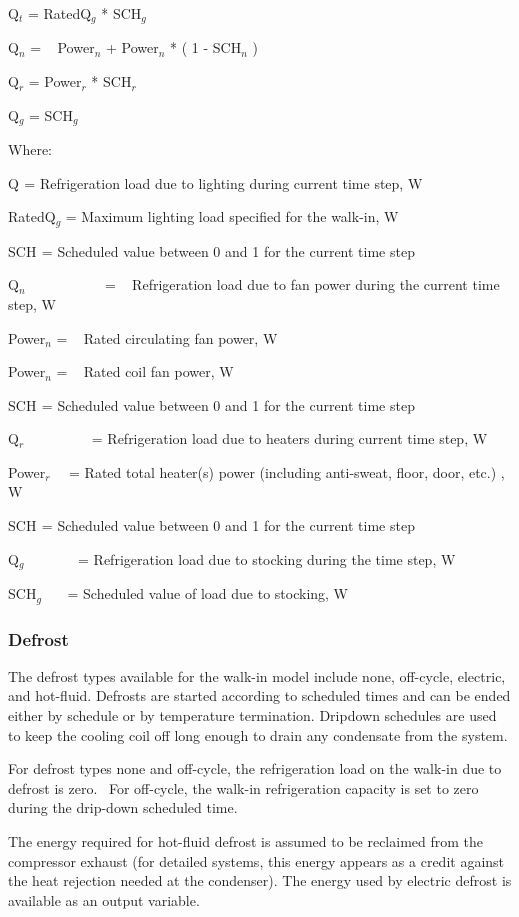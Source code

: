 Q\(_{t}\) = RatedQ\(_{g}\) * SCH\(_{g}\)

Q\(_{n}\) = ~ Power\(_{n}\) + Power\(_{n}\) * ( 1 - SCH\(_{n}\) )

Q\(_{r}\) = Power\(_{r}\) * SCH\(_{r}\)

Q\(_{g}\) = SCH\(_{g}\)

Where:

Q\(_{ }\) = Refrigeration load due to lighting during current time step, W

RatedQ\(_{g}\) = Maximum lighting load specified for the walk-in, W

SCH\(_{ }\) = Scheduled value between 0 and 1 for the current time step

Q\(_{n}\) ~~~~~~~~~~ = ~ Refrigeration load due to fan power during the current time step, W

Power\(_{n}\) = ~ Rated circulating fan power, W

Power\(_{n}\) = ~ Rated coil fan power, W

SCH\(_{ }\) = Scheduled value between 0 and 1 for the current time step

Q\(_{r}\)~~~~~~~~~ = Refrigeration load due to heaters during current time step, W

Power\(_{r}\)~~ = Rated total heater(s) power (including anti-sweat, floor, door, etc.) , W

SCH\(_{ }\) = Scheduled value between 0 and 1 for the current time step

Q\(_{g}\)~~~~~~~ = Refrigeration load due to stocking during the time step, W

SCH\(_{g}\)~~~ = Scheduled value of load due to stocking, W

\subsubsection{Defrost}\label{defrost}

The defrost types available for the walk-in model include none, off-cycle, electric, and hot-fluid. Defrosts are started according to scheduled times and can be ended either by schedule or by temperature termination. Dripdown schedules are used to keep the cooling coil off long enough to drain any condensate from the system.

For defrost types none and off-cycle, the refrigeration load on the walk-in due to defrost is zero.~ For off-cycle, the walk-in refrigeration capacity is set to zero during the drip-down scheduled time.

The energy required for hot-fluid defrost is assumed to be reclaimed from the compressor exhaust (for detailed systems, this energy appears as a credit against the heat rejection needed at the condenser). The energy used by electric defrost is available as an output variable.

